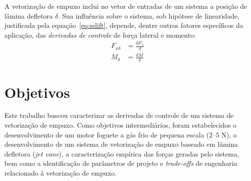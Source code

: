 A vetorização de empuxo inclui no vetor de entradas de um sistema a posição de lâmina defletora \(\delta \). Sua influência sobre o sistema, sob hipótese de linearidade, justificada pela equação~\ref{eq:sslift}, depende, dentre outros fatores específicos da aplicação, das \textit{derivadas de controle} de força lateral e momento:
\begin{align}
    F_{x\delta} &= \frac{\mathrm{d}F_x}{\delta} \\
    M_{\delta} &= \frac{\mathrm{d}M}{\delta}
\end{align}

\section{Objetivos}

Este trabalho buscou caracterizar as derivadas de controle de um sistema de vetorização de empuxo. Como objetivos intermediários, foram estabelecidos o desenvolvimento de um motor foguete a gás frio de pequena escala (\(2\)--\(5\;\mathrm{N}\)), o desenvolvimento de um sistema de vetorização de empuxo baseado em lâmina defletora (\textit{jet vane}), a caracterização empírica das forças geradas pelo sistema, bem como a identificação de parâmetros de projeto e \textit{trade-offs} de engenharia relacionado à vetorização de empuxo.